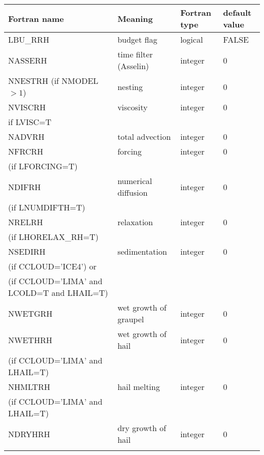 \begin{longtable} {|p{}|p{}|>{\centering}p{}|p{}<{\centering}|}
\hline
Fortran name & Meaning & Fortran type & default value \\
\hline \hline
\endhead
LBU\_RRH & budget flag & logical & FALSE\index{LBU\_RRH!\innam{NAM\_BU\_RRH}} \\\hline
NASSERH  & time filter (Asselin)   & integer  &  0 \index{NASSERH!\innam{NAM\_BU\_RRH}} \\\hline
NNESTRH (if NMODEL$>1$) & nesting           & integer  &  0 \index{NNESTRH!\innam{NAM\_BU\_RRH}} \\\hline
NVISCRH  & viscosity         & integer  &  0 \index{NVISCRH!\innam{NAM\_BU\_RRH}}\\
if LVISC=T &  &   &   \\\hline
NADVRH   & total advection   & integer  &  0 \index{NADVRH!\innam{NAM\_BU\_RRH}}\\\hline
NFRCRH   & forcing           & integer  &  0 \index{NFRCRH!\innam{NAM\_BU\_RRH}} \\ \nopagebreak
(if LFORCING=T) &  &   &   \\\hline
NDIFRH   & numerical diffusion & integer  &  0 \index{NDIFRH!\innam{NAM\_BU\_RRH}} \\ \nopagebreak
(if LNUMDIFTH=T) &  &   &   \\\hline
NRELRH   & relaxation        & integer  &  0 \index{NRELRH!\innam{NAM\_BU\_RRH}}\\ \nopagebreak
(if LHORELAX\_RH=T) &  &   &   \\\hline
NSEDIRH  & sedimentation    & integer  &  0 \index{NSEDIRH!\innam{NAM\_BU\_RRH}}\\ \nopagebreak
(if CCLOUD='ICE4') or & &   &  \\ \nopagebreak
(if CCLOUD='LIMA' and LCOLD=T and LHAIL=T) & &   &  \\\hline
NWETGRH  & wet growth of graupel  & integer  &  0 \index{NWETGRH!\innam{NAM\_BU\_RRH}}\\\hline
NWETHRH  & wet growth of hail  & integer  &  0 \index{NWETHRH!\innam{NAM\_BU\_RRH}}\\ \nopagebreak
(if CCLOUD='LIMA' and LHAIL=T) &  &   &  \\\hline
NHMLTRH  & hail melting  & integer  &  0 \index{NHMLTRH!\innam{NAM\_BU\_RRH}}\\ \nopagebreak
(if CCLOUD='LIMA' and LHAIL=T) &  &   &  \\\hline
NDRYHRH  &  dry growth of hail & integer  &  0 \index{NDRYHRH!\innam{NAM\_BU\_RRH}}\\ \nopagebreak

\end{longtable}
